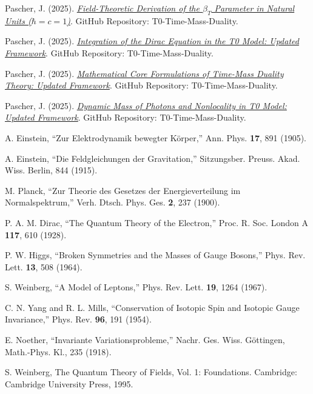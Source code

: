 \documentclass[twocolumn,aps,prl]{revtex4-2}
\begin{document}
	\begin{thebibliography}{99}
		
		Pascher, J. (2025). \href{https://github.com/jpascher/T0-Time-Mass-Duality/blob/main/2/pdf/DerivationVonBetaEn.pdf}{\textit{Field-Theoretic Derivation of the $\beta_T$ Parameter in Natural Units ($\hbar = c = 1$)}}. GitHub Repository: T0-Time-Mass-Duality.
		
		Pascher, J. (2025). \href{https://github.com/jpascher/T0-Time-Mass-Duality/tree/main/2/pdf/diracEn.pdf}{\textit{Integration of the Dirac Equation in the T0 Model: Updated Framework}}. GitHub Repository: T0-Time-Mass-Duality.
		
		Pascher, J. (2025). \href{https://github.com/jpascher/T0-Time-Mass-Duality/tree/main/2/pdf/MathZeitMasseLagrangeEn.pdf}{\textit{Mathematical Core Formulations of Time-Mass Duality Theory: Updated Framework}}. GitHub Repository: T0-Time-Mass-Duality.
		
		Pascher, J. (2025). \href{https://github.com/jpascher/T0-Time-Mass-Duality/tree/main/2/pdf/DynMassePhotonenNichtlokalEn.pdf}{\textit{Dynamic Mass of Photons and Nonlocality in T0 Model: Updated Framework}}. GitHub Repository: T0-Time-Mass-Duality.
		
		A. Einstein, ``Zur Elektrodynamik bewegter Körper,'' Ann. Phys. \textbf{17}, 891 (1905).
		
		A. Einstein, ``Die Feldgleichungen der Gravitation,'' Sitzungsber. Preuss. Akad. Wiss. Berlin, 844 (1915).
		
		M. Planck, ``Zur Theorie des Gesetzes der Energieverteilung im Normalspektrum,'' Verh. Dtsch. Phys. Ges. \textbf{2}, 237 (1900).
		
		P. A. M. Dirac, ``The Quantum Theory of the Electron,'' Proc. R. Soc. London A \textbf{117}, 610 (1928).
		
		P. W. Higgs, ``Broken Symmetries and the Masses of Gauge Bosons,'' Phys. Rev. Lett. \textbf{13}, 508 (1964).
		
		S. Weinberg, ``A Model of Leptons,'' Phys. Rev. Lett. \textbf{19}, 1264 (1967).
		
		C. N. Yang and R. L. Mills, ``Conservation of Isotopic Spin and Isotopic Gauge Invariance,'' Phys. Rev. \textbf{96}, 191 (1954).
		
		E. Noether, ``Invariante Variationsprobleme,'' Nachr. Ges. Wiss. Göttingen, Math.-Phys. Kl., 235 (1918).
		
		S. Weinberg, The Quantum Theory of Fields, Vol. 1: Foundations. Cambridge: Cambridge University Press, 1995.
		
	\end{thebibliography}
	
\end{document}
